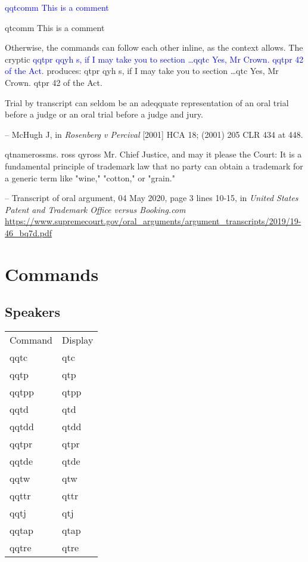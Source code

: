 \documentclass{article}
\newcommand\ccol[1]{\textcolor{blue}{#1}}
\begin{document}
\ccol{qqtcomm This is a comment}

qtcomm This is a comment

Otherwise, the commands can follow each other inline, as the context allows. The cryptic \ccol{qqtpr qqyh s, if I may take you to section \ldots qqtc Yes, Mr Crown. qqtpr 42 of the Act.} produces: qtpr qyh s, if I may take you to section \ldots qtc Yes, Mr Crown. qtpr 42 of the Act.

\begin{framed}\begin{qquotation}Trial by transcript can seldom be an adeqquate representation of an oral trial before a judge or an oral trial before a judge and jury.

-- McHugh J, in \textit{Rosenberg v Percival} [2001] HCA 18; (2001) 205 CLR 434 at 448.
\end{qquotation}\end{framed}


\begin{framed}\begin{qquotation}
qtname{ross}{ms. ross} qyross  Mr. Chief Justice, and may it please the Court: It is a fundamental principle of trademark law that no party can obtain a trademark for a generic term like "wine," "cotton," or "grain."

-- Transcript of oral argument, 04 May 2020, page 3 lines 10-15, in  \textit{United States Patent and Trademark Office versus Booking.com}\\
{\small\url{https://www.supremecourt.gov/oral_arguments/argument_transcripts/2019/19-46_bq7d.pdf}}
\end{qquotation}\end{framed}

\newpage
\section{Commands}

\subsection{Speakers}

\begin{tabular}{ll}
Command & Display \\
qqtc & qtc \\
qqtp & qtp \\ 
qqtpp & qtpp \\ 
qqtd & qtd \\ 
qqtdd & qtdd \\ 
qqtpr & qtpr \\ 
qqtde & qtde \\ 
qqtw & qtw \\ 
qqttr & qttr \\ 
qqtj & qtj \\ 
qqtap & qtap \\ 
qqtre & qtre \\ 
\end{tabular}
\end{document}
